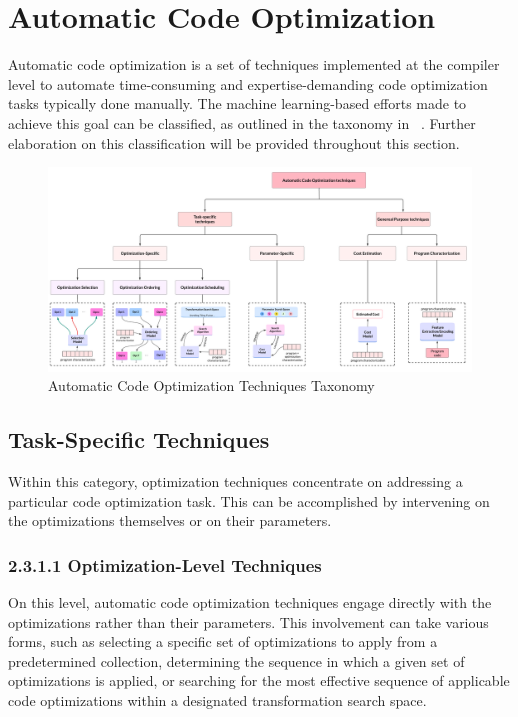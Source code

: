 \section{Automatic Code Optimization}\label{sec:aco:autosched}

    Automatic code optimization is a set of techniques implemented at the compiler level to automate time-consuming and expertise-demanding code optimization tasks typically done manually. The machine learning-based efforts made to achieve this goal can be classified, as outlined in the taxonomy in ~. Further elaboration on this classification will be provided throughout this section.

    \begin{figure}[hbt!]
        \begin{center}
        \includegraphics[width=1\textwidth]{assets/images/aco-taxonomy.png}
        \end{center}
        \caption{Automatic Code Optimization Techniques Taxonomy}%
        \label{sec:aco:autosched:taxonomy}
    \end{figure}

    
    \subsection{Task-Specific Techniques}

        Within this category, optimization techniques concentrate on addressing a particular code optimization task. This can be accomplished by intervening on the optimizations themselves or on their parameters.

        \subsubsection{2.3.1.1   Optimization-Level Techniques}
            On this level, automatic code optimization techniques engage directly with the optimizations rather than their parameters. This involvement can take various forms, such as selecting a specific set of optimizations to apply from a predetermined collection, determining the sequence in which a given set of optimizations is applied, or searching for the most effective sequence of applicable code optimizations within a designated transformation search space.
            
